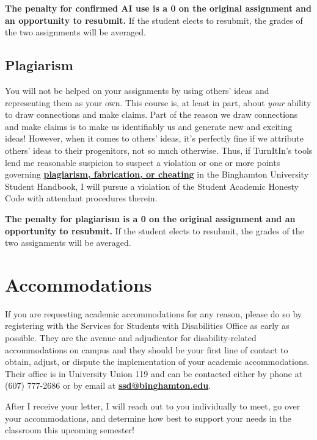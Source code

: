 \documentclass[12pt]{article}
\begin{document}
\par{\textbf{The penalty for confirmed AI use is a 0 on the original assignment and an opportunity to resubmit.} If the student elects to resubmit, the grades of the two assignments will be averaged.}

\subsection*{Plagiarism}
\par{You will not be helped on your assignments by using others' ideas and representing them as your own. This course is, at least in part, about \textit{your} ability to draw connections and make claims. Part of the reason we draw connections and make claims is to make us identifiably us and generate new and exciting ideas! However, when it comes to others' ideas, it's perfectly fine if we attribute others' ideas to their progenitors, not so much otherwise. Thus, if TurnItIn's tools lend me reasonable suspicion to suspect a violation or one or more points governing \href{https://catalog.binghamton.edu/content.php?catoid=2&navoid=66#student-academic-honesty-code}{\textbf{plagiarism, fabrication, or cheating}} in the Binghamton University Student Handbook, I will pursue a violation of the Student Academic Honesty Code with attendant procedures therein.}

\par{\textbf{The penalty for plagiarism is a 0 on the original assignment and an opportunity to resubmit.} If the student elects to resubmit, the grades of the two assignments will be averaged.}

\section*{Accommodations}
\par{If you are requesting academic accommodations for any reason, please do so by registering with the Services for Students with Disabilities Office as early as possible. They are the avenue and adjudicator for disability-related accommodations on campus and they should be your first line of contact to obtain, adjust, or dispute the implementation of your academic accommodations. Their office is in University Union 119 and can be contacted either by phone at (607) 777-2686 or by email at \href{ssd@binghamton.edu}{\textbf{ssd@binghamton.edu}}.}

\par{After I receive your letter, I will reach out to you individually to meet, go over your accommodations, and determine how best to support your needs in the classroom this upcoming semester!} 
\end{document}
